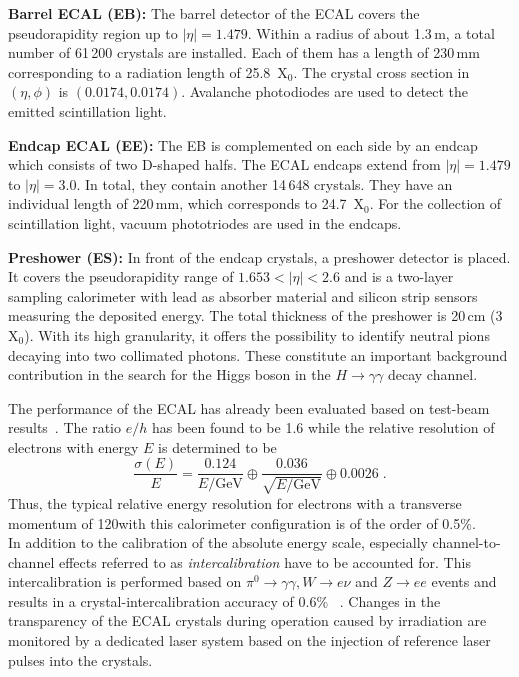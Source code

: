 \begin{description}
 \item \textbf{Barrel ECAL (EB):} The barrel detector of the ECAL covers the pseudorapidity region up to $|\eta| = 1.479$. Within a radius of about 1.3\,m, a total number of 61\,200 crystals are installed. Each of them has a length of 230\,mm corresponding to a radiation length of 25.8~$\mathrm{X_0}$. The crystal cross section in $(\eta, \phi)$ is $(0.0174, 0.0174)$. Avalanche photodiodes are used to detect the emitted scintillation light.
 \item \textbf{Endcap ECAL (EE):} The EB is complemented on each side by an endcap which consists of two D-shaped halfs. The ECAL endcaps extend from $|\eta| = 1.479$ to $|\eta| = 3.0$. In total, they contain another 14\,648 crystals. They have an individual length of 220\,mm, which corresponds to 24.7~$\mathrm{X}_0$. For the collection of scintillation light, vacuum phototriodes are used in the endcaps.
 \item \textbf{Preshower (ES):} In front of the endcap crystals, a preshower detector is placed. It covers the pseudorapidity range of $1.653 < |\eta| <2.6$ and is a two-layer sampling calorimeter with lead as absorber material and silicon strip sensors measuring the deposited energy. The total thickness of the preshower is 20\,cm (3~$\mathrm{X_0}$). With its high granularity, it offers the possibility to identify neutral pions decaying into two collimated photons. These constitute an important background contribution in the search for the Higgs boson in the $H \rightarrow \gamma \gamma$ decay channel.
\end{description}
The performance of the ECAL has already been evaluated based on test-beam results~\cite{Abramov:2000vd, springerlink:10.1140/epjc/s10052-009-0959-5}. The ratio $e/h$ has been found to be 1.6 while the relative resolution of electrons with energy $E$ is determined to be
\begin{equation}
\frac{\sigma(E)}{E}= \frac{0.124}{E/\mathrm{GeV}} \oplus \frac{0.036}{\sqrt{E/\mathrm{GeV}}} \oplus 0.0026 \; .
\end{equation}
Thus, the typical relative energy resolution for electrons with a transverse momentum of 120\gev with this calorimeter configuration is of the order of 0.5\%. \\
In addition to the calibration of the absolute energy scale, especially channel-to-channel effects referred to as \textit{intercalibration} have to be accounted for. This intercalibration is performed based on $\pi^0 \rightarrow \gamma \gamma, W \rightarrow e\nu$ and $Z \rightarrow ee$ events and results in a crystal-intercalibration accuracy of 0.6\% ~\cite{CMS-PAS-EGM-10-003}. Changes in the transparency of the ECAL crystals during operation caused by irradiation are monitored by a dedicated laser system based on the injection of reference laser pulses into the crystals. \\

